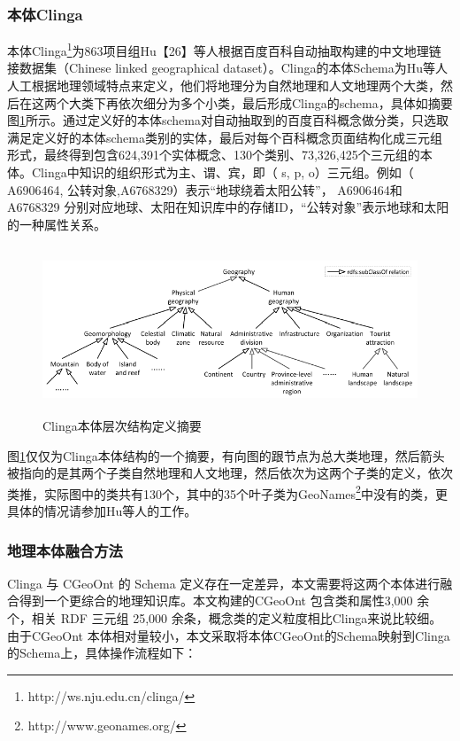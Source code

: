 \subsubsection{本体Clinga}

本体Clinga\footnote{http://ws.nju.edu.cn/clinga/}为863项目组Hu【26】等人根据百度百科自动抽取构建的中文地理链接数据集（Chinese linked geographical dataset）。Clinga的本体Schema为Hu等人人工根据地理领域特点来定义，他们将地理分为自然地理和人文地理两个大类，然后在这两个大类下再依次细分为多个小类，最后形成Clinga的schema，具体如摘要图\ref{fig:clinga}所示。通过定义好的本体schema对自动抽取到的百度百科概念做分类，只选取满足定义好的本体schema类别的实体，最后对每个百科概念页面结构化成三元组形式，最终得到包含624,391个实体概念、130个类别、73,326,425个三元组的本体。Clinga中知识的组织形式为主、谓、宾，即（ s, p, o）三元组。例如（ A6906464, 公转对象,A6768329）表示“地球绕着太阳公转”， A6906464和 A6768329 分别对应地球、太阳在知识库中的存储ID，“公转对象”表示地球和太阳的一种属性关系。

\begin{figure}[!htb]
	\centering\includegraphics[height=5cm]{resource/clinga}
	\caption{Clinga本体层次结构定义摘要}
	\label{fig:clinga}
\end{figure}

图\ref{fig:clinga}仅仅为Clinga本体结构的一个摘要，有向图的跟节点为总大类地理，然后箭头被指向的是其两个子类自然地理和人文地理，然后依次为这两个子类的定义，依次类推，实际图中的类共有130个，其中的35个叶子类为GeoNames\footnote{http://www.geonames.org/}中没有的类，更具体的情况请参加Hu等人的工作。

\subsubsection{地理本体融合方法}
Clinga 与 CGeoOnt 的 Schema 定义存在一定差异，本文需要将这两个本体进行融合得到一个更综合的地理知识库。本文构建的CGeoOnt 包含类和属性3,000 余个，相关 RDF 三元组 25,000 余条，概念类的定义粒度相比Clinga来说比较细。由于CGeoOnt 本体相对量较小，本文采取将本体CGeoOnt的Schema映射到Clinga的Schema上，具体操作流程如下：

